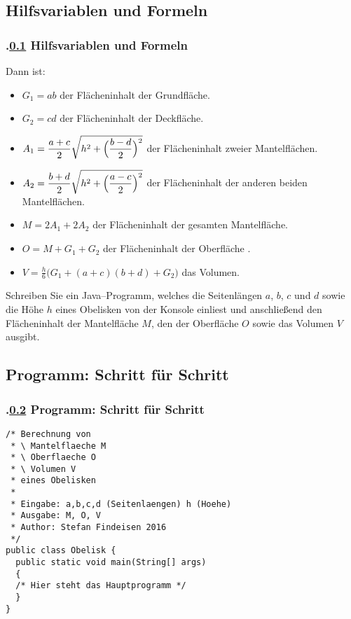 \def\stitle{Hilfsvariablen und Formeln}%
\subsection{\stitle}\label{S:Formeln}
\begin{frame}[t]%
    \frametitle{\kap.\ref{S:Formeln} \stitle}%

Dann ist:
\begin{itemize}
\item $G_1 = ab$ der Fl\"acheninhalt der Grundfl\"ache.
\item $G_2 = cd$ der Fl\"acheninhalt der Deckfl\"ache.
\item $\displaystyle A_1 = \frac{a+c}{2} \sqrt{h^2 + \Bigl(\frac{b-d}{2}\Bigr)^2}$
der Fl\"acheninhalt zweier Mantelfl\"achen.
\item $\displaystyle A_2 = \frac{b+d}{2} \sqrt{h^2 + \Bigl(\frac{a-c}{2}\Bigr)^2}$
der Fl\"acheninhalt der anderen beiden Mantelfl\"achen.
\item $M = 2 A_1 + 2 A_2$ der Fl\"acheninhalt der gesamten Mantelfl\"ache.
\item $O = M + G_1 + G_2$ der Fl\"acheninhalt der Oberfl\"ache .
\item $\displaystyle V = \frac{h}{6}\bigl(G_1 + (a+c)(b+d) + G_2\bigr)$ das Volumen.
\end{itemize}
\medskip

Schreiben Sie ein Java--Programm, welches die Seitenl\"angen $a$, $b$, $c$ und $d$ sowie die H\"ohe $h$ eines Obelisken von der Konsole einliest und anschlie\ss end den Fl\"acheninhalt der Mantelfl\"ache $M$, den der Oberfl\"ache $O$ sowie das Volumen $V$ ausgibt.

\end{frame}


\def\stitle{Programm: Schritt für Schritt}%
\subsection{\stitle}\label{S:Code}
\begin{frame}[fragile]%
    \frametitle{\kap.\ref{S:Code} \stitle}%

\begin{lstlisting}[style=java]
/* Berechnung von
 * \ Mantelflaeche M
 * \ Oberflaeche O
 * \ Volumen V
 * eines Obelisken
 *
 * Eingabe: a,b,c,d (Seitenlaengen) h (Hoehe)
 * Ausgabe: M, O, V
 * Author: Stefan Findeisen 2016
 */
public class Obelisk {
  public static void main(String[] args)
  {
  /* Hier steht das Hauptprogramm */
  }
}
\end{lstlisting}
\end{frame}


